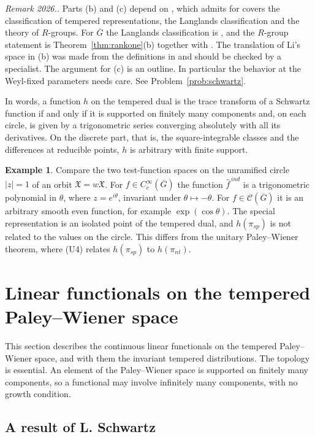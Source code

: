 \documentclass[12pt,letterpaper]{article}
\numberwithin{equation}{section}
\theoremstyle{definition}
\newtheorem{xexample}[theorem]{Example}
\newcounter{rmk}
\newcommand{\unverified}[1]{\refstepcounter{rmk}\par\smallskip\noindent\textit{Remark 2026.\arabic{rmk}.} #1\par\smallskip}
\newcommand{\bG}{\overline{G}}
\newcommand{\calC}{\mathcal C}
\newcommand{\fX}{\mathfrak X}
\begin{document}
\unverified{Parts (b) and (c) depend on \cite{Li12}, which admits for covers the
classification of tempered representations, the Langlands classification and the theory
of $R$-groups.  For $\bG$ the Langlands classification is \cite{BJ13}, and the $R$-group
statement is Theorem~\ref{thm:rankone}(b) together with \cite{Lu20}.  The translation of
Li's space in (b) was made from the definitions in \cite[\S5.6]{Li12} and should be
checked by a specialist.  The argument for (c) is an outline.  In particular the behavior
at the Weyl-fixed parameters needs care.  See Problem~\ref{prob:schwartz}.}

In words, a function $h$ on the tempered dual is the trace transform of a Schwartz
function if and only if it is supported on finitely many components and, on each circle,
is given by a trigonometric series converging absolutely with all its derivatives.  On the
discrete part, that is, the square-integrable classes and the differences at reducible
points, $h$ is arbitrary with finite support.

\begin{xexample}\label{ex:PWt}
Compare the two test-function spaces on the unramified circle $|z|=1$ of an orbit
$\fX=w\fX$.  For $f\in C_c^\infty(\bG)$ the function $\hat f^{\,ind}$ is a trigonometric
polynomial in $\theta$, where $z=e^{i\theta}$, invariant under $\theta\mapsto-\theta$.
For $f\in\calC(\bG)$ it is an arbitrary smooth even function, for example
$\exp(\cos\theta)$.  The special representation is an isolated point of the tempered dual,
and $h(\pi_{sp})$ is not related to the values on the circle.  This differs from the
unitary Paley--Wiener theorem, where (U4) relates $h(\pi_{sp})$ to $h(\pi_{nt})$.
\end{xexample}

\section{Linear functionals on the tempered Paley--Wiener space}\label{sec:functionals}

This section describes the continuous linear functionals on the tempered Paley--Wiener
space, and with them the invariant tempered distributions.  The topology is essential.  An
element of the Paley--Wiener space is supported on finitely many components, so a
functional may involve infinitely many components, with no growth condition.

\subsection{A result of L. Schwartz}
\end{document}
